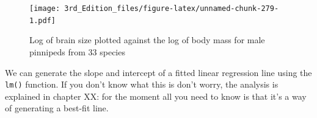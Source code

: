 \documentclass[
]{book}
\newenvironment{Shaded}{\begin{snugshade}}{\end{snugshade}}
\newcommand{\DataTypeTok}[1]{\textcolor[rgb]{0.13,0.29,0.53}{#1}}
\newcommand{\FloatTok}[1]{\textcolor[rgb]{0.00,0.00,0.81}{#1}}
\newcommand{\KeywordTok}[1]{\textcolor[rgb]{0.13,0.29,0.53}{\textbf{#1}}}
\newcommand{\NormalTok}[1]{#1}
\newcommand{\OperatorTok}[1]{\textcolor[rgb]{0.81,0.36,0.00}{\textbf{#1}}}
\newcommand{\OtherTok}[1]{\textcolor[rgb]{0.56,0.35,0.01}{#1}}
\newcommand{\StringTok}[1]{\textcolor[rgb]{0.31,0.60,0.02}{#1}}
\begin{document}
\begin{Shaded}
\end{Shaded}

\begin{figure}
\centering
\texttt{[image: 3rd\_Edition\_files/figure-latex/unnamed-chunk-279-1.pdf]}
\caption{\label{fig:unnamed-chunk-279}Log of brain size plotted against the log of body mass for male pinnipeds from 33 species}
\end{figure}

We can generate the slope and intercept of a fitted linear regression line using the \texttt{lm()} function. If you don't know what this is don't worry, the analysis is explained in chapter XX: for the moment all you need to know is that it's a way of generating a best-fit line.

\begin{Shaded}
\end{Shaded}
\end{document}
